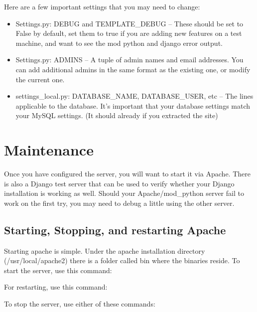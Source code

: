 Here are a few important settings that you may need to change:

\begin{itemize}
\item Settings.py: DEBUG and TEMPLATE\_DEBUG  -- These should be set to False by default, set them to true if you are adding new features on a test machine, and want to see the mod python and django error output.
\item Settings.py: ADMINS -- A tuple of admin names and email addresses.  You can add additional admins in the same format as the existing one, or modify the current one.
\item settings\_local.py: DATABASE\_NAME, DATABASE\_USER, etc -- The lines applicable to the database.  It's important that your database settings match your MySQL settings.  (It should already if you extracted the site)

\end{itemize}


\section{Maintenance}

Once you have configured the server, you will want to start it via Apache.  There is also a Django test server that can be used to verify whether your Django installation is working as well.  Should your Apache/mod\_python server fail to work on the first try, you may need to debug a little using the other server.

\subsection{Starting, Stopping, and restarting Apache}

Starting apache is simple.  Under the apache installation directory (/usr/local/apache2) there is a folder called bin where the binaries reside.  To start the server, use this command:


\vspace{1pc}

For restarting, use this command:


\vspace{1pc}

To stop the server, use either of these commands:

